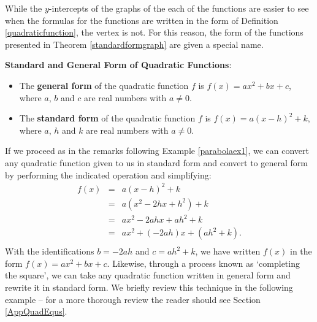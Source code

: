While the $y$-intercepts of the graphs of the each of the functions are easier to see when the formulas for the functions are written in the form of Definition \ref{quadraticfunction}, the vertex is not.  For this reason, the form of the functions presented in Theorem \ref{standardformgraph} are given a special name.

\medskip

\colorbox{ResultColor}{\bbm

\begin{defn} \label{standardgeneralformofparabolas} \textbf{Standard and General Form of Quadratic Functions}: 

\begin{itemize}

\item The  \textbf{general form} of the quadratic function $f$ is $f(x) = ax^2+bx+c$, where $a$, $b$ and $c$ are real numbers with $a \neq 0$.

\item The  \textbf{standard form} of the quadratic function $f$ is $f(x) = a(x-h)^2 + k$, where $a$, $h$ and $k$ are real numbers with $a\neq 0$.

\end{itemize}

\end{defn}

\ebm}

\medskip
{}
\label{standardtogeneraldiscussion}
If we proceed as in the remarks following Example \ref{parabolaex1}, we can convert any quadratic function given to us in standard form and convert to general form by performing the indicated operation and simplifying: \[ \begin{array}{rcl}

f(x) &  = & a(x-h)^2 + k  \\
      &= &   a \left(x^2 -2hx + h^2 \right) + k  \\
      & =  & ax^2 - 2ahx + ah^2 + k   \\
      & =  & a x^2 + (-2ah)x + (ah^2+k). \\  \end{array}\] With the identifications $b = -2ah$ and $c = ah^2+k$, we have written $f(x)$ in the form $f(x) = ax^2 + bx+c$.  Likewise, through a process known as   `completing the square', we can take any quadratic function written in general form and rewrite it in standard form.  We briefly review this technique in the following example -- for a more thorough review the reader should see Section \ref{AppQuadEqus}. 

